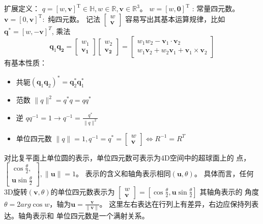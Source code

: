 \documentclass[lang=cn,newtx,10pt,scheme=chinese]{elegantbook}
\begin{document}
扩展定义：
$q=[w, \boldsymbol{v}]^{\mathrm{T}} \in \mathbb{H}, w \in \mathbb{R}, 
\boldsymbol{v} \in \mathbb{R}^3$。
$w=[w, \mathbf{0}]^{\mathrm{T}}$ : 常量四元数。
$\boldsymbol{v}=[0, \boldsymbol{v}]^{\mathrm{T}}:$ 纯四元数。
记法
$
\left[\begin{array}{l}
  w \\
  \boldsymbol{v}
  \end{array}\right]
  $
容易写出其基本运算规律，比如$\boldsymbol{q}^{*}=[w, -\boldsymbol{v}]^T$,
乘法\begin{equation}
  \boldsymbol{q}_1 \boldsymbol{q}_{\mathbf{2}}=\left[\begin{array}{l}
  w_1 \\
  \boldsymbol{v}_{\mathbf{1}}
  \end{array}\right]\left[\begin{array}{c}
  w_2 \\
  \boldsymbol{v}_{\mathbf{2}}
  \end{array}\right]=\left[\begin{array}{c}
  w_1 w_2-\boldsymbol{v}_1 \cdot \boldsymbol{v}_2 \\
  w_1 \boldsymbol{v}_2+w_2 \boldsymbol{v}_1+\boldsymbol{v}_1 \times \boldsymbol{v}_2
  \end{array}\right]
  \end{equation}
有基本性质：
\begin{itemize}
  \item 共轭$(\boldsymbol{q}_1 \boldsymbol{q}_2)^*
  = \boldsymbol{q}^{*}_2 \boldsymbol{q}^{*}_1$
  \item 范数 $\|q\|^2 = q^{*}q= qq^{*}$
  \item 逆 $qq^{-1}=1 \rightarrow q^{-1}=\frac{q^*}{\|q\|^2}$
  \item 单位四元数 $\|q\|=1, q^{-1}=q^*=
  \left[\begin{array}{l}
    w \\
    \boldsymbol{v}
    \end{array}\right] \Leftrightarrow R^{-1} = R^T$
\end{itemize}

对比复平面上单位圆的表示，单位四元数可表示为4D空间中的超球面上的
点，$\left[\begin{array}{l}
  \cos\frac{\theta}{2}, \\
  \boldsymbol{u}\sin\frac{\theta}{2} 
  \end{array}\right], \|\boldsymbol{u}\|=1$。
表示的含义和轴角表示相同$(\boldsymbol{u}, \theta)$。
具体而言，任何3D旋转$(\boldsymbol{v}, \theta)$的单位四元数表示为
$
\left[\begin{array}{l}
  w \\
  \boldsymbol{v}
\end{array}\right] = \left[ \cos\frac{\theta}{2}, 
\boldsymbol{u}\sin\frac{\theta}{2} \right]
$
其轴角表示的
角度$\theta = 2 arg \cos w$，轴为$\boldsymbol{u}=
\frac{\boldsymbol{v}}{\|\boldsymbol{v}\|}$。
这里左右表达在行列上有差异，右边应保持列表达。轴角表示和
单位四元数是一个满射关系。
\end{document}
